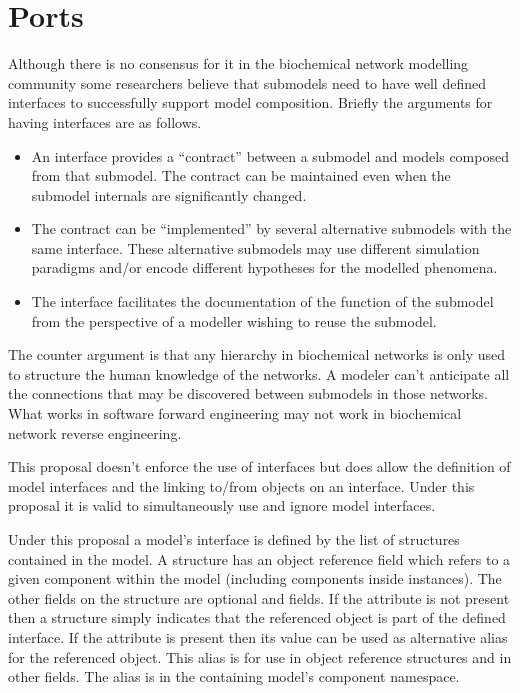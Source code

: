 \documentclass{cekarticle}
\begin{document}
\section{Ports}
\label{sec:ports}

Although there is no consensus for it in the biochemical network modelling community some researchers
believe that submodels need to have well defined interfaces to successfully support model composition.
Briefly the arguments for having interfaces are as follows.
\begin{itemize}
\item An interface provides a ``contract'' between a submodel and models composed
from that submodel.  The contract can be 
maintained even when the submodel internals are significantly changed.
\item The contract can be ``implemented'' by several alternative submodels with the same interface.  These
alternative submodels may use different simulation paradigms and/or encode different hypotheses for the modelled
phenomena. 
\item The interface facilitates the documentation of the function of the submodel from the perspective of a modeller
wishing to reuse the submodel.
\end{itemize}

The counter argument is that any hierarchy in biochemical networks is only used to structure the human knowledge
of the networks.  A modeler can't anticipate all the connections that may be discovered between submodels in those
networks.  What works in software forward engineering may not work in biochemical network reverse engineering.

This proposal doesn't enforce the use of interfaces but does allow the definition of model interfaces and
the linking to/from objects on an interface.  Under this proposal it is valid to simultaneously use and ignore model interfaces.

Under this proposal a model's interface is defined by the list of  structures contained in the model.
A  structure has an object reference field which refers to a given component within the model (including
components inside instances).  The other fields on the  structure are optional  and
 fields.  If the  attribute is not present then a  structure simply indicates
that the referenced object is part of the defined interface.  If the  attribute is present then its value
can be used as alternative alias for the referenced object.  This alias is for use in object reference structures and
in other  fields.  The alias is in the containing model's component namespace.
\end{document}
